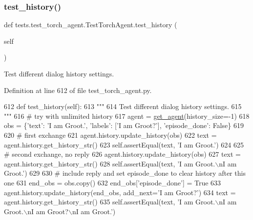 \subsubsection{\texorpdfstring{test\+\_\+history()}{test\_history()}}
{\footnotesize\ttfamily def tests.\+test\+\_\+torch\+\_\+agent.\+Test\+Torch\+Agent.\+test\+\_\+history (\begin{DoxyParamCaption}\item[{}]{self }\end{DoxyParamCaption})}

\begin{DoxyVerb}Test different dialog history settings.
\end{DoxyVerb}
 

Definition at line 612 of file test\+\_\+torch\+\_\+agent.\+py.


\begin{DoxyCode}
612     \textcolor{keyword}{def }test\_history(self):
613         \textcolor{stringliteral}{"""}
614 \textcolor{stringliteral}{        Test different dialog history settings.}
615 \textcolor{stringliteral}{        """}
616         \textcolor{comment}{# try with unlimited history}
617         agent = \hyperlink{namespacetests_1_1test__torch__agent_ae929d109305aaea29fbfa13ecf1f32e9}{get\_agent}(history\_size=-1)
618         obs = \{\textcolor{stringliteral}{'text'}: \textcolor{stringliteral}{'I am Groot.'}, \textcolor{stringliteral}{'labels'}: [\textcolor{stringliteral}{'I am Groot?'}], \textcolor{stringliteral}{'episode\_done'}: \textcolor{keyword}{False}\}
619 
620         \textcolor{comment}{# first exchange}
621         agent.history.update\_history(obs)
622         text = agent.history.get\_history\_str()
623         self.assertEqual(text, \textcolor{stringliteral}{'I am Groot.'})
624 
625         \textcolor{comment}{# second exchange, no reply}
626         agent.history.update\_history(obs)
627         text = agent.history.get\_history\_str()
628         self.assertEqual(text, \textcolor{stringliteral}{'I am Groot.\(\backslash\)nI am Groot.'})
629 
630         \textcolor{comment}{# include reply and set episode\_done to clear history after this one}
631         end\_obs = obs.copy()
632         end\_obs[\textcolor{stringliteral}{'episode\_done'}] = \textcolor{keyword}{True}
633         agent.history.update\_history(end\_obs, add\_next=\textcolor{stringliteral}{'I am Groot?'})
634         text = agent.history.get\_history\_str()
635         self.assertEqual(text, \textcolor{stringliteral}{'I am Groot.\(\backslash\)nI am Groot.\(\backslash\)nI am Groot?\(\backslash\)nI am Groot.'})

\end{DoxyCode}
